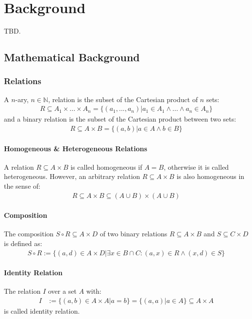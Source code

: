 \chapter{Background}
TBD.

\section{Mathematical Background}
\subsection{Relations}
A $n$-ary, $n \in \mathbb{N}$, relation is the subset of the Cartesian product of $n$ sets:
\begin{align}
R \subseteq A_1 \times ... \times A_n 
= \{ (a_1,...,a_n) | a_1 \in A_1 \wedge ... \wedge a_n \in A_n \}
\end{align} 
and a binary relation is the subset of the Cartesian product between two sets:
\begin{align}
R \subseteq A \times B = \{ (a,b) | a \in A \wedge b \in B \}
\end{align}

\subsubsection{Homogeneous \& Heterogeneous Relations}
A relation $R \subseteq A \times B$ is called homogeneous if $A = B$, otherwise it is called heterogeneous.
However, an arbitrary relation $R \subseteq A \times B$ is also homogeneous in the sense of:
\begin{align}
R \subseteq A \times B \subseteq (A \cup B) \times (A \cup B)
\end{align}


\subsubsection{Composition}
The composition $S \circ R \subseteq A \times D$ of two binary relations $R \subseteq A \times B$ and $S \subseteq C \times D$ is defined as:
\begin{align}
S \circ R := \{ (a,d) \in A \times D | \exists x \in B \cap C : (a,x) \in R \wedge (x,d) \in S \}
\end{align}

\subsubsection{Identity Relation}
The relation $I$ over a set $A$ with:
\begin{align}
I &:= \{ (a,b) \in A \times A | a = b \} = \{ (a,a) | a \in A \} \subseteq A \times A
\end{align}
is called identity relation.

